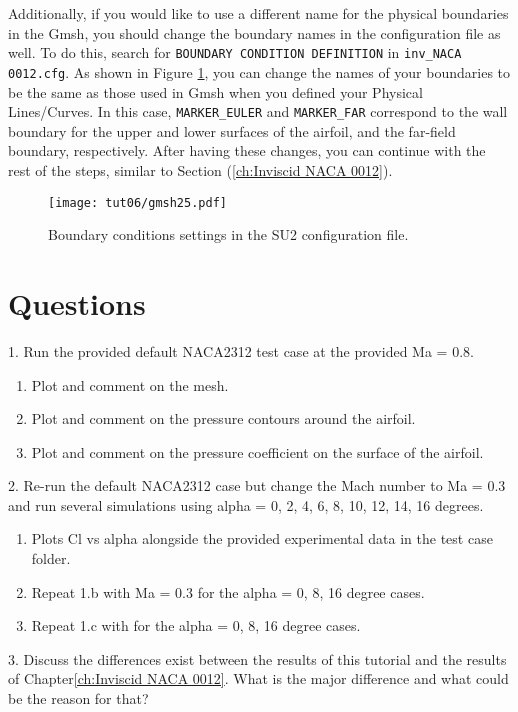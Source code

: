 Additionally, if you would like to use a different name for the physical boundaries in the Gmsh, you should change the boundary names in the configuration file as well. To do this, search for \texttt{BOUNDARY CONDITION DEFINITION} in \texttt{inv\_NACA 0012.cfg}. As shown in Figure \ref{fig6:gmsh25}, you can change the names of your boundaries to be the same as those used in Gmsh when you defined your Physical Lines/Curves. In this case, \texttt{MARKER\_EULER} and \texttt{MARKER\_FAR} correspond to the wall boundary for the upper and lower surfaces of the airfoil, and the far-field boundary, respectively. After having these changes, you can continue with the rest of the steps, similar to Section (\ref{ch:Inviscid NACA 0012}).
\begin{figure}[ht]
    \centering
    \texttt{[image: tut06/gmsh25.pdf]}
    \caption{Boundary conditions settings in the SU2 configuration file.}
    \label{fig6:gmsh25}
\end{figure}
\section*{Questions}
1. Run the provided default NACA2312 test case at the provided Ma = 0.8.
\begin{enumerate}[label=(\alph*)]
    \item Plot and comment on the mesh.
    \item Plot and comment on the pressure contours around the airfoil.
    \item Plot and comment on the pressure coefficient on the surface of the airfoil.
\end{enumerate}
2. Re-run the default NACA2312 case but change the Mach number to Ma = 0.3 and run several simulations using alpha = 0, 2, 4, 6, 8, 10, 12, 14, 16 degrees.
\begin{enumerate}[label=(\alph*)]
    \item Plots Cl vs alpha alongside the provided experimental data\cite{ladson1988effects} in the test case folder.
    \item Repeat 1.b with Ma = 0.3 for the alpha = 0, 8, 16 degree cases.
    \item Repeat 1.c with for the alpha = 0, 8, 16 degree cases.
\end{enumerate}
3. Discuss the differences exist between the results of this tutorial and the results of Chapter\ref{ch:Inviscid NACA 0012}. What is the major difference and what could be the reason for that?
